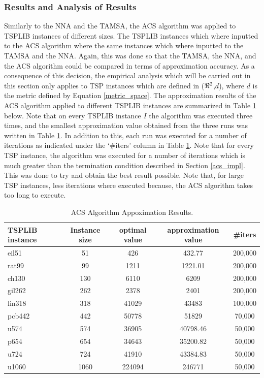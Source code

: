 \documentclass[12pt]{article}
\numberwithin{equation}{subsection}
\numberwithin{table}{subsection}
\numberwithin{algorithm}{subsection}
\numberwithin{figure}{subsection}
\begin{document}
\subsubsection{Results and Analysis of Results}
\label{acs_analysis}
Similarly to the NNA and the TAMSA, the ACS algorithm was applied to TSPLIB instances of different sizes. The TSPLIB instances which where inputted to the ACS algorithm where the same instances which where inputted to the TAMSA and the NNA. Again, this was done so that the TAMSA, the NNA, and the ACS algorithm could be compared in terms of approximation accuracy. As a consequence of this decision, the empirical analysis which will be carried out in this section only applies to TSP instances which are defined in ($\real^2$,$d$), where $d$ is the metric defined by Equation \ref{metric_space}. The approximation results of the ACS algorithm applied to different TSPLIB instances are summarized in Table \ref{tab:ACS_results} below. Note that on every TSPLIB instance $I$ the algorithm was executed three times, and the smallest approximation value obtained from the three runs was written in Table \ref{tab:ACS_results}. In addition to this, each run was executed for a number of iterations as indicated under the `\#iters' column in Table \ref{tab:ACS_results}. Note that for every TSP instance, the algorithm was executed for a number of iterations which is much greater than the termination condition described in Section \ref{acs_impl}. This was done to try and obtain the best result possible. Note that, for large TSP instances, less iterations where executed because, the ACS algorithm takes too long to execute.
\begin{table}[H]
    \caption{ACS Algorithm Appoximation Results.}
    \label{tab:ACS_results}
    \begin{tabular}{l|c|c|c|c} %
      \textbf{TSPLIB instance} & \textbf{Instance size} & \textbf{optimal value} & \textbf{approximation value} &\textbf{\#iters}\\
      \hline
    eil51 & 51 & 426 & 432.77 & 200,000\\
    rat99 & 99 & 1211 & 1221.01& 200,000 \\
    ch130 & 130 & 6110 & 6209 & 200,000\\
    gil262 & 262 & 2378 & 2401 & 200,000\\
    lin318 & 318 & 41029 & 43483 & 100,000\\
    pcb442 & 442 & 50778 & 51829 & 70,000\\
    u574 & 574  & 36905 & 40798.46 & 50,000\\ 
    p654 & 654 & 34643 & 35200.82 &50,000\\
    u724 & 724 & 41910 & 43384.83 & 50,000\\
    u1060 & 1060 & 224094 & 246771& 50,000\\
    \end{tabular}
\end{table}
\end{document}

